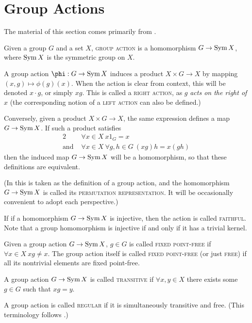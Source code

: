\documentclass{report}
\begin{document}
  \section{Group Actions}
    The material of this section comes primarily from \cite[Section~1.7;
    Chapter~4]{dummit-foote}.

    \begin{defn}\label{group-action}
      Given a group $G$ and a set $X$,
      \textsc{group action} is a homomorphism $G \to \operatorname{Sym} X$,
      where $\operatorname{Sym} X$ is the symmetric group on $X$.
    \end{defn}

    A group action $\phi: G \to \Sym X$ induces a product
    $X \times G \to X$ by mapping $(x, g) \mapsto \phi(g)(x)$.
    When the action is clear from context,
    this will be denoted $x \cdot g$, or simply $xg$.
    This is called a \textsc{right action},
    as $g$ \textit{acts on the right of} $x$
    (the corresponding notion of a \textsc{left action}
    can also be defined.)

    Conversely, given a product $X \times G \to X$,
    the same expression defines a map $G \to \operatorname{Sym} X$.
    If such a product satisfies
    \begin{alignat*}{2}
      &\forall x \in X\ x 1_G = x \\
      \text{and } &\forall x \in X\ \forall g, h \in G\
        (x g) h = x(gh)
    \end{alignat*}
    then the induced map $G \to \operatorname{Sym} X$ will be a homomorphism,
    so that these definitions are equivalent.

    (In \cite{dummit-foote}
    this is taken as the definition of a group action,
    and the homomorphism $G \to \operatorname{Sym} X$ is called its \textsc{permutation
    representation}.  It will be occasionally convenient to adopt each
    perspective.)

    \begin{defn}\label{group-action-types}
      If if a homomorphism $G \to \operatorname{Sym} X$ is injective,
      then the action is called \textsc{faithful}.
      Note that a group homomorphism is injective
      if and only if it has a trivial kernel.

      Given a group action $G \to \operatorname{Sym} X$,
      $g \in G$ is called \textsc{fixed point-free}
      if $\forall x \in X\ xg \neq x$.
      The group action itself is called \textsc{fixed point-free}
      (or just \textsc{free}) if all its nontrivial elements
      are fixed point-free.

      A group action $G \to \operatorname{Sym} X$ is called \textsc{transitive}
      if $\forall x, y \in X$ there exists some $g \in G$
      such that $xg = y$.

      A group action is called \textsc{regular} if it is simultaneously
      transitive and free.  (This terminology follows \cite{godsil}.)
    \end{defn}
\end{document}
